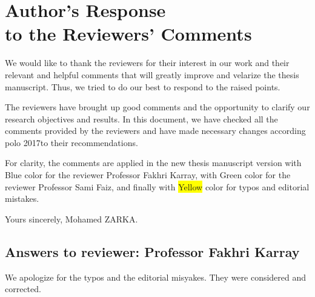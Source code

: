 \chapter*{Author's Response \\ to the Reviewers' Comments}


	We would like to thank the reviewers for their interest in our work and their
	relevant and helpful comments that will greatly improve and velarize the thesis manuscript. 
	Thus, we tried to do our best to respond to the raised points. 

	The reviewers have brought up good comments and the opportunity 
	to clarify our research objectives and results. In this document, we have
	checked all the comments provided by the reviewers and have made necessary 
	changes according polo 2017to their recommendations.

	For clarity, the comments are applied in the new thesis manuscript version 
	with \colorbox{babyblue}{\textsf{Blue}} color for the reviewer Professor Fakhri Karray, 
	with \colorbox{brightgreen}{\textsf{Green}} color for the reviewer Professor Sami Faiz, 
	and finally with \colorbox{yellow}{\textsf{Yellow}} color for typos and editorial mistakes.

	\vfill
	Yours sincerely, Mohamed ZARKA.


	\newpage

\section*{Answers to reviewer: Professor Fakhri Karray}


\answer We apologize for the typos and the editorial misyakes. They were considered and corrected.




